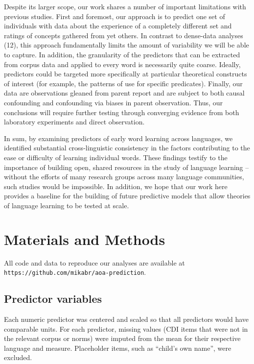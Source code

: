 \documentclass[english,man]{apa6}
\theoremstyle{definition}
\theoremstyle{definition}
\theoremstyle{definition}
\theoremstyle{remark}
\begin{document}
Despite its larger scope, our work shares a number of important
limitations with previous studies. First and foremost, our approach is
to predict one set of individuals with data about the experience of a
completely different set and ratings of concepts gathered from yet
others. In contrast to dense-data analyses (12), this approach
fundamentally limits the amount of variability we will be able to
capture. In addition, the granularity of the predictors that can be
extracted from corpus data and applied to every word is necessarily
quite coarse. Ideally, predictors could be targeted more specifically at
particular theoretical constructs of interest (for example, the patterns
of use for specific predicates). Finally, our data are observations
gleaned from parent report and are subject to both causal confounding
and confounding via biases in parent observation. Thus, our conclusions
will require further testing through converging evidence from both
laboratory experiments and direct observation.

In sum, by examining predictors of early word learning across languages,
we identified substantial cross-linguistic consistency in the factors
contributing to the ease or difficulty of learning individual words.
These findings testify to the importance of building open, shared
resources in the study of language learning -- without the efforts of
many research groups across many language communities, such studies
would be impossible. In addition, we hope that our work here provides a
baseline for the building of future predictive models that allow
theories of language learning to be tested at scale.

\newpage

\section{Materials and Methods}\label{materials-and-methods}

All code and data to reproduce our analyses are available at
\texttt{https://github.com/mikabr/aoa-prediction}.

\subsection{Predictor variables}\label{predictor-variables}

Each numeric predictor was centered and scaled so that all predictors
would have comparable units. For each predictor, missing values (CDI
items that were not in the relevant corpus or norms) were imputed from
the mean for their respective language and measure. Placeholder items,
such as \enquote{child's own name}, were excluded.
\end{document}
